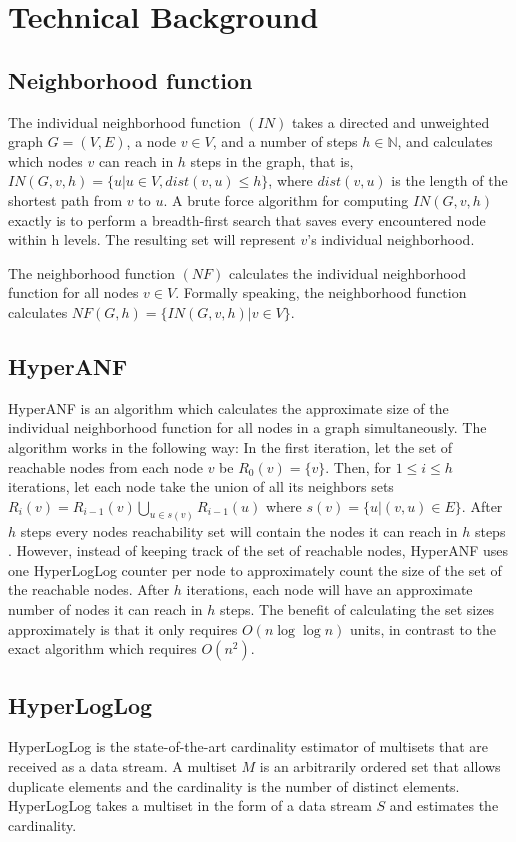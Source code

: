 \chapter{Technical Background}

\section{Neighborhood function}
The individual neighborhood function $(IN)$ takes a directed and unweighted graph $G = (V,E)$, a node $v \in V$, and a number of steps $h \in \mathbb{N}$, and calculates which nodes $v$ can reach in $h$ steps in the graph, that is, $IN(G,v,h) = \{u | u \in V, dist(v,u) \leq h\}$, where $dist(v,u)$ is the length of the shortest path from $v$ to $u$. A brute force algorithm for computing $IN(G,v,h)$ exactly is to perform a breadth-first search that saves every encountered node within h levels. The resulting set will represent $v$'s individual neighborhood.

The neighborhood function $(NF)$ calculates the individual neighborhood function for all nodes $v \in V$. Formally speaking, the neighborhood function calculates $NF(G,h) = \{ IN(G,v,h) | v \in V \}$.

\section{HyperANF}
HyperANF is an algorithm which calculates the approximate size of the individual neighborhood function for all nodes in a graph simultaneously. The algorithm works in the following way: In the first iteration, let the set of reachable nodes from each node $v$ be $R_0(v) = \{v\}$. Then, for $1 \leq i \leq h$ iterations, let each node take the union of all its neighbors sets $R_i(v) = R_{i-1}(v) \bigcup\limits_{u \in s(v)} R_{i-1}(u) $ where $s(v) = \{u | (v,u) \in E\}$. After $h$ steps every nodes reachability set will contain the nodes it can reach in $h$ steps \cite{hyperball}. However, instead of keeping track of the set of reachable nodes, HyperANF uses one HyperLogLog counter per node to approximately count the size of the set of the reachable nodes. After $h$ iterations, each node will have an approximate number of nodes it can reach in $h$ steps. The benefit of calculating the set sizes approximately is that it only requires $O(n\log\log n)$ units, in contrast to the exact algorithm which requires $O(n^2)$.

\section{HyperLogLog}
HyperLogLog \cite{hyperloglog} is the state-of-the-art cardinality estimator of multisets that are received as a data stream. A multiset $M$ is an arbitrarily ordered set that allows duplicate elements and the cardinality is the number of distinct elements. HyperLogLog takes a multiset in the form of a data stream $S$ and estimates the cardinality.

